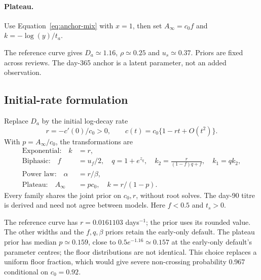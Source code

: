 \documentclass[11pt,a4paper]{article}
\newcommand{\reporttable}[1]{%
  }
\begin{document}
\paragraph{Plateau.} Use Equation~\eqref{eq:anchor-mix} with $x=1$,
then set $A_\infty=c_0f$ and $k=-\log(y)/t_a$.

\begin{table}[H]
\centering\small
\caption{Additional priors for the two-anchor default and broader
specifications. These replace Table~\ref{tab:early}.}
\label{tab:anchors}
\reporttable{two-anchor-priors}
\end{table}
The reference curve gives $D_a\simeq1.16$, $\rho\simeq0.25$ and
$u_s\simeq0.37$. Priors are fixed across reviews. The day-365 anchor
is a latent parameter, not an added observation.

\subsection{Initial-rate formulation}
Replace $D_a$ by the initial log-decay rate
\begin{equation}
  r=-c'(0)/c_0>0,\qquad c(t)=c_0\{1-rt+O(t^2)\}.
\end{equation}
With $p=A_\infty/c_0$, the transformations are
\begin{align}
  \text{Exponential:}\quad k&=r,\\
  \text{Biphasic:}\quad f&=u_f/2,\quad q=1+e^{z_q},\quad
    k_2=\frac{r}{(1-f)q+f},\quad k_1=qk_2,\\
  \text{Power law:}\quad \alpha&=r/\beta,\\
  \text{Plateau:}\quad A_\infty&=pc_0,\quad k=r/(1-p).
\end{align}
Every family shares the joint prior on $c_0,r$, without root solves.
The day-90 titre is derived and need not agree between models.
Here $f<0.5$ and $t_s>0$.

\begin{table}[H]
\centering\small
\caption{Initial-rate priors: independent free variables; no additional
prior on $D_a$ or either later anchor.}
\label{tab:rate}
\reporttable{initial-rate-priors}
\end{table}
The reference curve has $r=0.0161103$ days$^{-1}$; the prior uses its
rounded value. The other widths and the $f,q,\beta$ priors retain the
early-only default. The plateau prior has median $p\simeq0.159$, close
to $0.5e^{-1.16}\simeq0.157$ at the early-only default's parameter
centres; the floor distributions are not identical. This choice replaces
a uniform floor fraction, which would give severe non-crossing
probability 0.967 conditional on $c_0=0.92$.
\end{document}

